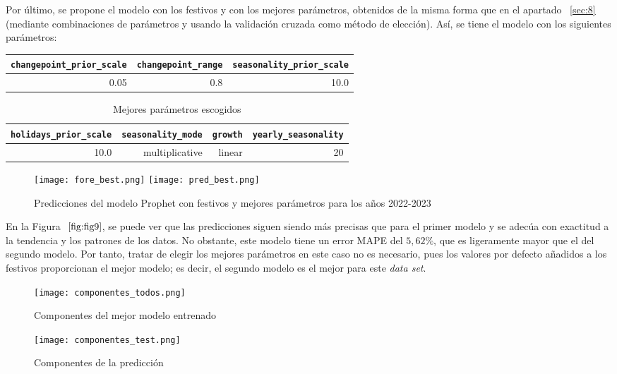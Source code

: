 \documentclass[12pt,twoside]{article}
\begin{document}
Por último, se propone el modelo con los festivos y con los mejores parámetros, obtenidos de la misma forma que en el apartado ~\ref{sec:8} (mediante combinaciones de parámetros y usando la validación cruzada como método de elección). Así, se tiene el modelo con los siguientes parámetros: 

\begin{table}[ht] 
\centering
\begin{tabular}{rrr} 
  \hline
 \texttt{changepoint\_prior\_scale} & \texttt{changepoint\_range} & \texttt{seasonality\_prior\_scale} \\ 
  \hline
0.05 & 0.8 & 10.0 \\ 
   \hline
\end{tabular}
\end{table}

\begin{table}[ht] 
\centering
\begin{tabular}{rrrr} 
  \hline
 \texttt{holidays\_prior\_scale} & \texttt{seasonality\_mode} & \texttt{growth} & \texttt{yearly\_seasonality} \\ 
  \hline
10.0 & multiplicative & linear & 20 \\ 
   \hline
\end{tabular}
\caption{Mejores parámetros escogidos} \label{tab:01}
\end{table}

\begin{figure}[h]
    \centering
    \texttt{[image: fore\_best.png]}
    \texttt{[image: pred\_best.png]}
    \caption{Predicciones del modelo Prophet con festivos y mejores parámetros para los años 2022-2023} 
    \label{fig:fig9}
\end{figure}

En la Figura $~\ref{fig:fig9}$, se puede ver que las predicciones siguen siendo más precisas que para el primer modelo y se adecúa con exactitud a la tendencia y los patrones de los datos. No obstante, este modelo tiene un error MAPE del $5,62\%$, que es ligeramente mayor que el del segundo modelo. Por tanto, tratar de elegir los mejores parámetros en este caso no es necesario, pues los valores por defecto añadidos a los festivos proporcionan el mejor modelo; es decir, el segundo modelo es el mejor para este \textit{data set}.

\begin{figure}[h]
    \centering
    \texttt{[image: componentes\_todos.png]}
    \caption{Componentes del mejor modelo entrenado }
    \label{fig:fig10}
    \texttt{[image: componentes\_test.png]}
    \caption{Componentes de la predicción} 
    \label{fig:fig11}
\end{figure}
\end{document}
